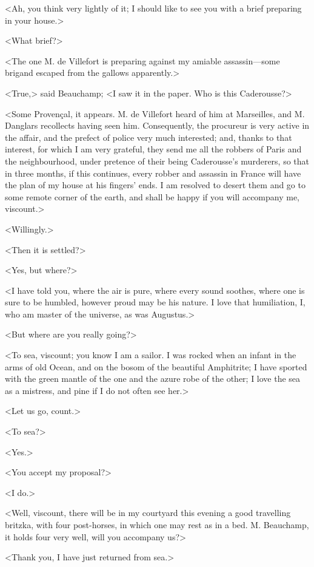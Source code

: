  <Ah, you think very lightly of it; I should like to see you with a brief preparing in your house.> 

 <What brief?> 

 <The one M. de Villefort is preparing against my amiable assassin—some brigand escaped from the gallows apparently.> 

 <True,> said Beauchamp; <I saw it in the paper. Who is this Caderousse?> 

 <Some Provençal, it appears. M. de Villefort heard of him at Marseilles, and M. Danglars recollects having seen him. Consequently, the procureur is very active in the affair, and the prefect of police very much interested; and, thanks to that interest, for which I am very grateful, they send me all the robbers of Paris and the neighbourhood, under pretence of their being Caderousse's murderers, so that in three months, if this continues, every robber and assassin in France will have the plan of my house at his fingers' ends. I am resolved to desert them and go to some remote corner of the earth, and shall be happy if you will accompany me, viscount.> 

 <Willingly.> 

 <Then it is settled?> 

 <Yes, but where?> 

 <I have told you, where the air is pure, where every sound soothes, where one is sure to be humbled, however proud may be his nature. I love that humiliation, I, who am master of the universe, as was Augustus.> 

 <But where are you really going?> 

 <To sea, viscount; you know I am a sailor. I was rocked when an infant in the arms of old Ocean, and on the bosom of the beautiful Amphitrite; I have sported with the green mantle of the one and the azure robe of the other; I love the sea as a mistress, and pine if I do not often see her.> 

 <Let us go, count.> 

 <To sea?> 

 <Yes.> 

 <You accept my proposal?> 

 <I do.> 

 <Well, viscount, there will be in my courtyard this evening a good travelling britzka, with four post-horses, in which one may rest as in a bed. M. Beauchamp, it holds four very well, will you accompany us?> 

 <Thank you, I have just returned from sea.> 

